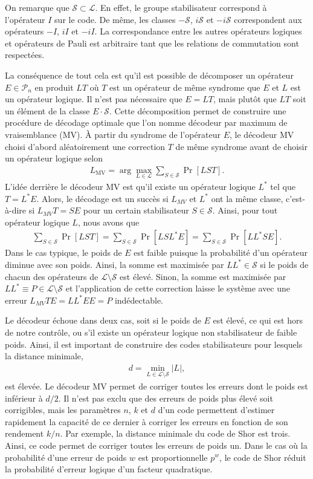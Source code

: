 On remarque que $\mathcal S \subset \mathcal L$.
En effet, le groupe stabilisateur correspond à l'opérateur $I$ sur le code.
De même, les classes $-\mathcal S$, $i\mathcal S$ et $-i\mathcal S$ correspondent
aux opérateurs $-I$, $iI$ et $-iI$.
La correspondance entre les autres opérateurs logiques et opérateurs de Pauli est
arbitraire tant que les relations de commutation sont respectées.

La conséquence de tout cela est qu'il est possible de décomposer un opérateur
$E \in \mathcal P_n$ en produit $LT$ où $T$ est un opérateur de même syndrome que $E$
et $L$ est un opérateur logique.
Il n'est pas nécessaire que $E = LT$, mais plutôt que $LT$ soit un élément de la classe $E \cdot \mathcal S$.
Cette décomposition permet de construire une procédure de décodage optimale que l'on 
nomme décodeur par maximum de vraisemblance (MV).
À partir du syndrome de l'opérateur $E$, 
le décodeur MV choisi d'abord aléatoirement une correction $T$ de même syndrome avant
de choisir un opérateur logique selon
\begin{align}
  L_{\text{MV}} = \arg\max_{L \in \mathcal L} \sum_{S \in \mathcal S} \Pr[LST].
\end{align}
L'idée derrière le décodeur MV est qu'il existe un opérateur logique $L^*$ tel que $T = L^*E$.
Alors, le décodage est un succès si $L_{MV}$ et $L^*$ ont la même classe,
c'est-à-dire si $L_{MV}T = SE$ pour un certain stabilisateur $S \in \mathcal S$.
Ainsi, pour tout opérateur logique $L$, nous avons que 
\begin{align}
  \sum_{S\in \mathcal S} \Pr[LST]
  =
  \sum_{S\in \mathcal S} \Pr[LSL^*E]
  =
  \sum_{S\in \mathcal S} \Pr[LL^*SE].
\end{align}
Dans le cas typique,
le poids de $E$ est faible puisque la probabilité d'un opérateur diminue avec son poids.
Ainsi, la somme est maximisée par $LL^* \in \mathcal S$ si le poids de chacun des opérateurs de
$\mathcal L \setminus \mathcal S$ est élevé.
Sinon,
la somme est maximisée par $LL^* \equiv P \in \mathcal L \setminus \mathcal S$ 
et l'application de cette correction laisse le système avec une erreur $L_{MV}TE = LL^*EE = P$ indédectable.

Le décodeur échoue dans deux cas,
soit si le poids de $E$ est élevé, ce qui est hors de notre contrôle,
ou s'il existe un opérateur logique non stabilisateur de faible poids.
Ainsi,
il est important de construire des codes stabilisateurs pour lesquels la distance minimale,
\begin{align}
  d = \min_{L \in \mathcal L \setminus \mathcal S} |L|,
\end{align}
est élevée.
Le décodeur MV permet de corriger toutes les erreurs dont le poids est inférieur à $d / 2$.
Il n'est pas exclu que des erreurs de poids plus élevé soit corrigibles, 
mais les paramètres $n$, $k$ et $d$ d'un code permettent d'estimer rapidement la capacité
de ce dernier à corriger les erreurs en fonction de son rendement $k/n$.
Par exemple,
la distance minimale du code de Shor est trois.
Ainsi, ce code permet de corriger toutes les erreurs de poids un.
Dans le cas où la probabilité d'une erreur de poids $w$ est proportionnelle $p^w$,
le code de Shor réduit la probabilité d'erreur logique d'un facteur quadratique.

